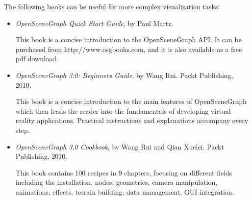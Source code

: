 The following books can be useful for more complex visualization tasks:

\begin{itemize}
\item \textit{OpenSceneGraph Quick Start Guide}, by Paul Martz.

This book is a concise introduction to the OpenSceneGraph API. It can be
purchased from http://www.osgbooks.com, and it is also available as
a free pdf download.

\item \textit{OpenSceneGraph 3.0: Beginners Guide}, by Wang Rui. Packt Publishing, 2010.

This book is a concise introduction to the main features of OpenSceneGraph
which then leads the reader into the fundamentals of developing virtual reality
applications. Practical instructions and explanations accompany every step.

\item \textit{OpenSceneGraph 3.0 Cookbook}, by Wang Rui and Qian Xuelei. Packt Publishing, 2010.

This book contains 100 recipes in 9 chapters, focusing on different
fields including the installation, nodes, geometries, camera manipulation,
animations, effects, terrain building, data management, GUI integration.

\end{itemize}


